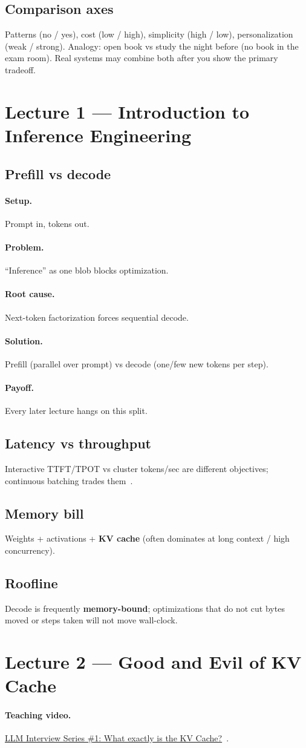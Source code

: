 \documentclass[11pt,a4paper]{article}
\newcommand{\setup}{\paragraph{Setup.}}
\newcommand{\problem}{\paragraph{Problem.}}
\newcommand{\rootcause}{\paragraph{Root cause.}}
\newcommand{\solution}{\paragraph{Solution.}}
\newcommand{\payoff}{\paragraph{Payoff.}}
\begin{document}
\subsection{Comparison axes}
Patterns (no / yes), cost (low / high), simplicity (high / low), personalization (weak / strong).
Analogy: open book vs study the night before (no book in the exam room).
Real systems may combine both after you show the primary tradeoff.

\section{Lecture 1 --- Introduction to Inference Engineering}
\subsection{Prefill vs decode}
\setup Prompt in, tokens out.
\problem ``Inference'' as one blob blocks optimization.
\rootcause Next-token factorization forces sequential decode.
\solution Prefill (parallel over prompt) vs decode (one/few new tokens per step).
\payoff Every later lecture hangs on this split.

\subsection{Latency vs throughput}
Interactive TTFT/TPOT vs cluster tokens/sec are different objectives; continuous batching trades them~\cite{kwon2023vllm}.

\subsection{Memory bill}
Weights + activations + \textbf{KV cache} (often dominates at long context / high concurrency).

\subsection{Roofline}
Decode is frequently \textbf{memory-bound}; optimizations that do not cut bytes moved or steps taken will not move wall-clock.

\section{Lecture 2 --- Good and Evil of KV Cache}
\paragraph{Teaching video.}
\href{https://www.youtube.com/watch?v=CxRGWfcGVbs}{LLM Interview Series \#1: What exactly is the KV Cache?}~\cite{vizuara-kv-yt}.
\end{document}

